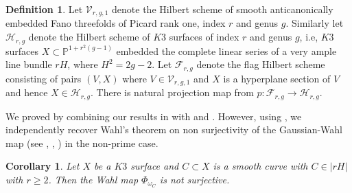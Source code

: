 \documentclass[11pt,twoside]{amsart}
\theoremstyle{plain}
\numberwithin{equation}{section}
\newtheorem{proposition}[theorem]{Proposition}
\newtheorem{corollary}[theorem]{Corollary}
\theoremstyle{definition}
\newtheorem{definition}[theorem]{Definition}
\begin{document}


\begin{definition}\label{Hilbert scheme of Fanos and K3}
    Let $\mathcal{V}_{r,g,1}$ denote the Hilbert scheme of smooth anticanonically embedded Fano threefolds of Picard rank one, index $r$ and genus $g$. Similarly let $\mathcal{H}_{r,g}$ denote the Hilbert scheme of $K3$ surfaces of index $r$ and genus $g$, i.e, $K3$ surfaces $X \subset \mathbb{P}^{1+r^2(g-1)}$ embedded the complete linear series of a very ample line bundle $rH$, where $H^2 = 2g-2$. Let $\mathcal{F}_{r,g}$ denote the flag Hilbert scheme consisting of pairs $(V,X)$ where $V \in \mathcal{V}_{r,g,1}$ and $X$ is a hyperplane section of $V$ and hence $X \in \mathcal{H}_{r,g}$. There is natural projection map from $p: \mathcal{F}_{r,g} \to \mathcal{H}_{r,g}$.
\end{definition}

\color{black}
 We proved  by combining our results in  with \cite{CDS20} and \cite{ABS17}. However, using , we independently recover Wahl's theorem on non surjectivity of the Gaussian-Wahl map (see \cite{W87},  \cite{BM87}, \cite{CM90}) in the non-prime case.

\begin{corollary}\label{Wahl}
 Let $X$ be a $K3$ surface and $C \subset X$ is a smooth curve with $C \in |rH|$ with $r \geq 2$. Then the Wahl map $\Phi_{\omega_C}$ is not surjective. 
\end{corollary}
\end{document}
